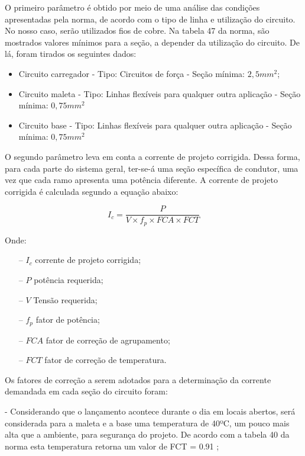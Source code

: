 O primeiro parâmetro é obtido por meio de uma análise das condições apresentadas pela norma, de acordo com o tipo de linha e utilização do circuito. No nosso caso, serão utilizados fios de cobre. Na tabela 47 da norma, são mostrados valores mínimos para a seção, a depender da utilização do circuito. De lá, foram tirados os seguintes dados:

\begin{itemize}
    \item Circuito carregador - Tipo: Circuitos de força - Seção mínima: $2,5mm^2$;
    \item Circuito maleta - Tipo: Linhas flexíveis para qualquer outra aplicação - Seção mínima: $0,75mm^2$
    \item Circuito base - Tipo: Linhas flexíveis para qualquer outra aplicação - Seção mínima: $0,75mm^2$
\end{itemize}

O segundo parâmetro leva em conta a corrente de projeto corrigida. Dessa forma, para cada parte do sistema geral, ter-se-á uma seção específica de condutor, uma vez que cada ramo apresenta uma potência diferente. A corrente de projeto corrigida é calculada segundo a equação abaixo:

\begin{equation}
    I_{c} = \frac{P}{V \times f_{p} \times FCA \times FCT}
\end{equation}

Onde:
\begin{itemize}
    \item [--] $I_{c}$ corrente de projeto corrigida;
    \item [--] $P$ potência requerida;
    \item [--] $V$ Tensão requerida;
    \item [--] $f_{p}$ fator de potência;
    \item [--] $FCA$ fator de correção de agrupamento;
    \item [--] $FCT$  fator de correção de temperatura.
\end{itemize}
Os fatores de correção a serem adotados para a determinação da corrente demandada em cada seção do circuito foram:

- Considerando que o lançamento acontece durante o dia em locais abertos, será considerada para a maleta e a base uma temperatura de 40ºC, um pouco mais alta que a ambiente, para segurança do projeto. De acordo com a tabela 40 da norma esta temperatura retorna um valor de FCT = 0.91 ;

